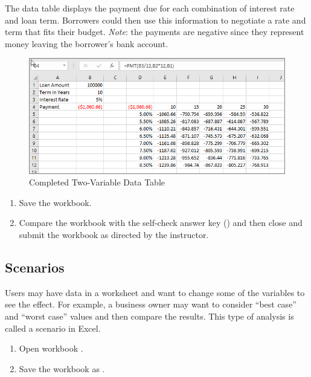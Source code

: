 The data table displays the payment due for each combination of interest rate and loan term. Borrowers could then use this information to negotiate a rate and term that fits their budget. \textit{Note}: the payments are negative since they represent money leaving the borrower's bank account.

\begin{figure}[H]
	\centering
	\includegraphics[width=\maxwidth{.95\linewidth}]{gfx/ch08_fig45}
	\caption{Completed Two-Variable Data Table}
	\label{08:fig45}
\end{figure}

\begin{enumbox}
	\begin{enumerate}
		\item Save the  workbook.
		\item Compare the workbook with the self-check answer key () and then close and submit the  workbook as directed by the instructor.
	\end{enumerate}
\end{enumbox}

\subsection{Scenarios}

Users may have data in a worksheet and want to change some of the variables to see the effect. For example, a business owner may want to consider ``best case'' and ``worst case'' values and then compare the results. This type of analysis is called a scenario in Excel.

\begin{enumbox}
	\begin{enumerate}
		\item Open workbook .
		\item Save the workbook as .
	\end{enumerate}
\end{enumbox}

